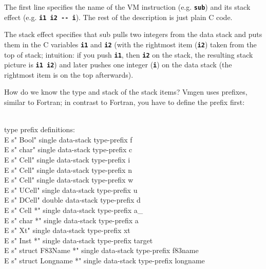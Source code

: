 \documentclass[10pt,english]{article}
\begin{document}
The first line specifies the name of the VM instruction (e.g. \texttt{\textbf{sub}})
and its stack effect (e.g. \texttt{\textbf{i1 i2 -{}- i}}). The rest
of the description is just plain C code.

The stack effect specifies that sub pulls two integers from the data
stack and puts them in the C variables \texttt{\textbf{i1}} and \texttt{\textbf{i2}}
(with the rightmost item (\texttt{\textbf{i2}}) taken from the top
of stack; intuition: if you push \texttt{\textbf{i1}}, then \texttt{\textbf{i2}}
on the stack, the resulting stack picture is \texttt{\textbf{i1 i2}})
and later pushes one integer (\texttt{\textbf{i}}) on the data stack
(the rightmost item is on the top afterwards).

How do we know the type and stack of the stack items? Vmgen uses prefixes,
similar to Fortran; in contrast to Fortran, you have to define the
prefix first:

\nwenddocs{}\endmoddef
\\ type prefix definitions:
\\E s" Bool"              single data-stack type-prefix f
\\E s" char"              single data-stack type-prefix c
\\E s" Cell"              single data-stack type-prefix i
\\E s" Cell"              single data-stack type-prefix n
\\E s" Cell"              single data-stack type-prefix w
\\E s" UCell"             single data-stack type-prefix u
\\E s" DCell"             double data-stack type-prefix d
\\E s" Cell *"            single data-stack type-prefix a_
\\E s" char *"            single data-stack type-prefix a
\\E s" Xt"                single data-stack type-prefix xt
\\E s" Inst *"            single data-stack type-prefix target
\\E s" struct F83Name *"  single data-stack type-prefix f83name
\\E s" struct Longname *" single data-stack type-prefix longname 
\nwendcode{}\nwdocspar
\end{document}
